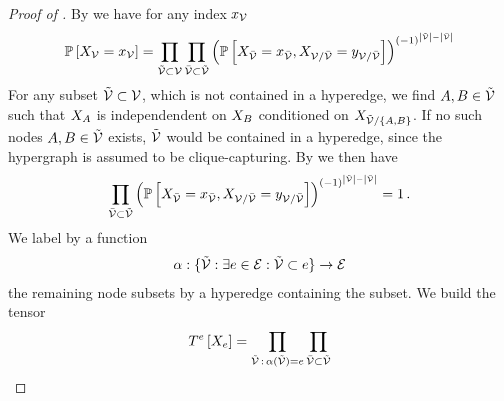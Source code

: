 \begin{proof}[Proof of ]
	By  we have for any index $x_{\mathcal{V}}$
	\begin{align*}
		\mathbb{P}\left[X_{\mathcal{V}}=x_{\mathcal{V}}\right] =
		\prod_{\tilde{\mathcal{V}}\subset\mathcal{V}} \prod_{\bar{\mathcal{V}}\subset\tilde{\mathcal{V}}}
		\left(
			\mathbb{P}\left[X_{\bar{\mathcal{V}}}=x_{\bar{\mathcal{V}}},X_{\mathcal{V}/\bar{\mathcal{V}}}=y_{\mathcal{V}/\bar{\mathcal{V}}}\right]
		\right)^{(-1)^{\left|\tilde{\mathcal{V}}\right|-\left|\bar{\mathcal{V}}\right|}}
	\end{align*}
	For any subset $\tilde{\mathcal{V}}\subset\mathcal{V}$, which is not contained in a hyperedge, we find $A,B \in\tilde{\mathcal{V}}$ such that $X_{A}$ is independendent on $X_{B}$ conditioned on $X_{\tilde{\mathcal{V}}/\{A,B\}}$.
	If no such nodes $A,B \in\tilde{\mathcal{V}}$ exists, $\tilde{\mathcal{V}}$ would be contained in a hyperedge, since the hypergraph is assumed to be clique-capturing.
	By  we then have
	\begin{align*}
	 \prod_{\bar{\mathcal{V}}\subset\tilde{\mathcal{V}}}
		\left(
			\mathbb{P}\left[X_{\bar{\mathcal{V}}}=x_{\bar{\mathcal{V}}},X_{\mathcal{V}/\bar{\mathcal{V}}}=y_{\mathcal{V}/\bar{\mathcal{V}}}\right]
		\right)^{(-1)^{\left|\tilde{\mathcal{V}}\right|-\left|\bar{\mathcal{V}}\right|}} = 1 \, .
	\end{align*}
	We label by a function
	\begin{align*}
		\alpha: \{\tilde{\mathcal{V}} : \exists e\in\mathcal{E}: \tilde{\mathcal{V}} \subset e \} \rightarrow \mathcal{E}
	\end{align*}
	the remaining node subsets by a hyperedge containing the subset.
	We build the tensor
	\begin{align*}
		\hypercoreofat{\edge}{\catvariableof{\edge}} = \prod_{\secnodes \, : \, \alpha(\secnodes) = \edge} \prod_{\thirdnodes\subset\secnodes}

\end{align*}
\end{proof}
